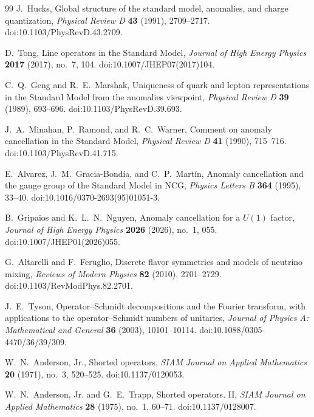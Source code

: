 \documentclass[11pt]{article}
\numberwithin{equation}{section}
\theoremstyle{definition}
\theoremstyle{remark}
\begin{document}
\begin{thebibliography}{99}
J.~Hucks,
\newblock Global structure of the standard model, anomalies, and charge
quantization,
\newblock \emph{Physical Review D} \textbf{43} (1991), 2709--2717.
\newblock doi:10.1103/PhysRevD.43.2709.

D.~Tong,
\newblock Line operators in the Standard Model,
\newblock \emph{Journal of High Energy Physics} \textbf{2017} (2017),
no.~7, 104.
\newblock doi:10.1007/JHEP07(2017)104.

C.~Q.~Geng and R.~E.~Marshak,
\newblock Uniqueness of quark and lepton representations in the Standard Model
from the anomalies viewpoint,
\newblock \emph{Physical Review D} \textbf{39} (1989), 693--696.
\newblock doi:10.1103/PhysRevD.39.693.

J.~A.~Minahan, P.~Ramond, and R.~C.~Warner,
\newblock Comment on anomaly cancellation in the Standard Model,
\newblock \emph{Physical Review D} \textbf{41} (1990), 715--716.
\newblock doi:10.1103/PhysRevD.41.715.

E.~Alvarez, J.~M.~Gracia-Bond\'ia, and C.~P.~Mart\'in,
\newblock Anomaly cancellation and the gauge group of the Standard Model in
NCG,
\newblock \emph{Physics Letters B} \textbf{364} (1995), 33--40.
\newblock doi:10.1016/0370-2693(95)01051-3.

B.~Gripaios and K.~L.~N.~Nguyen,
\newblock Anomaly cancellation for a $U(1)$ factor,
\newblock \emph{Journal of High Energy Physics} \textbf{2026} (2026), no.~1, 055.
\newblock doi:10.1007/JHEP01(2026)055.

G.~Altarelli and F.~Feruglio,
\newblock Discrete flavor symmetries and models of neutrino mixing,
\newblock \emph{Reviews of Modern Physics} \textbf{82} (2010), 2701--2729.
\newblock doi:10.1103/RevModPhys.82.2701.

J.~E.~Tyson,
\newblock Operator--Schmidt decompositions and the Fourier transform, with
applications to the operator--Schmidt numbers of unitaries,
\newblock \emph{Journal of Physics A: Mathematical and General} \textbf{36}
(2003), 10101--10114.
\newblock doi:10.1088/0305-4470/36/39/309.

W.~N.~Anderson, Jr.,
\newblock Shorted operators,
\newblock \emph{SIAM Journal on Applied Mathematics} \textbf{20} (1971),
no.~3, 520--525.
\newblock doi:10.1137/0120053.

W.~N.~Anderson, Jr. and G.~E.~Trapp,
\newblock Shorted operators. II,
\newblock \emph{SIAM Journal on Applied Mathematics} \textbf{28} (1975),
no.~1, 60--71.
\newblock doi:10.1137/0128007.


\end{thebibliography}
\end{document}
